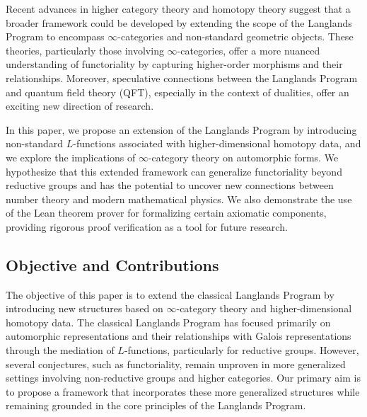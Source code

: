 \documentclass{article}
\theoremstyle{remark}
\begin{document}
Recent advances in higher category theory and homotopy theory suggest that a broader framework could be developed by extending the scope of the Langlands Program to encompass $\infty$-categories and non-standard geometric objects. These theories, particularly those involving $\infty$-categories, offer a more nuanced understanding of functoriality by capturing higher-order morphisms and their relationships. Moreover, speculative connections between the Langlands Program and quantum field theory (QFT), especially in the context of dualities, offer an exciting new direction of research.
    
In this paper, we propose an extension of the Langlands Program by introducing non-standard $L$-functions associated with higher-dimensional homotopy data, and we explore the implications of $\infty$-category theory on automorphic forms. We hypothesize that this extended framework can generalize functoriality beyond reductive groups and has the potential to uncover new connections between number theory and modern mathematical physics. We also demonstrate the use of the Lean theorem prover for formalizing certain axiomatic components, providing rigorous proof verification as a tool for future research.

\subsection{Objective and Contributions}

The objective of this paper is to extend the classical Langlands Program by introducing new structures based on $\infty$-category theory and higher-dimensional homotopy data. The classical Langlands Program has focused primarily on automorphic representations and their relationships with Galois representations through the mediation of $L$-functions, particularly for reductive groups. However, several conjectures, such as functoriality, remain unproven in more generalized settings involving non-reductive groups and higher categories. Our primary aim is to propose a framework that incorporates these more generalized structures while remaining grounded in the core principles of the Langlands Program.
\end{document}
